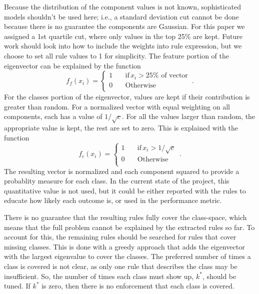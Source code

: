 \documentclass[11pt]{article}
\begin{document}
Because the distribution of the component values is not known, sophisticated models shouldn't be used here; i.e., a standard deviation cut cannot be done because there is no guarantee the components are Gaussian. For this paper we assigned a 1st quartile cut, where only values in the top 25\% are kept. Future work should look into how to include the weights into rule expression, but we choose to set all rule values to 1 for simplicity. The feature portion of the eigenvector can be explained by the function
\begin{equation}
f_f(x_i)=\begin{cases}
          1 \quad &\text{if} \, x_i > 25\% \text{ of vector} \\
          0 \quad &\text{Otherwise} \\
     \end{cases} \, .
\end{equation}
For the classes portion of the eigenvector, values are kept if their contribution is greater than random. For a normalized vector with equal weighting on all components, each has a value of $1/\sqrt{c}$. For all the values larger than random, the appropriate value is kept, the rest are set to zero. This is explained with the function
\begin{equation}
f_c(x_i)=\begin{cases}
          1 \quad &\text{if} \, x_i > 1/\sqrt{c} \\
          0 \quad &\text{Otherwise} \\
     \end{cases} \, .
\end{equation}
The resulting vector is normalized and each component squared to provide a probablity measure for each class. In the current state of the project, this quantitative value is not used, but it could be either reported with the rules to educate how likely each outcome is, or used in the performance metric.

There is no guarantee that the resulting rules fully cover the class-space, which means that the full problem cannot be explained by the extracted rules so far. To account for this, the remaining rules should be searched for rules that cover missing classes. This is done with a greedy approach that adds the eigenvector with the largest eigenvalue to cover the classes. The preferred number of times a class is covered is not clear, as only one rule that describes the class may be insufficient. So, the number of times each class must show up, $k^*$, should be tuned. If $k^*$ is zero, then there is no enforcement that each class is covered. 
\end{document}
